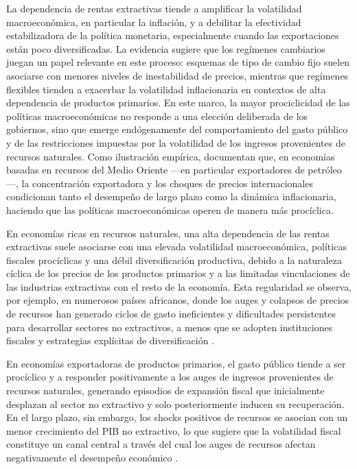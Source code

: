 \documentclass[../../TFM.tex]{subfiles}
\begin{document}
	La dependencia de rentas extractivas tiende a amplificar la volatilidad macroeconómica, en particular la inflación, y a debilitar la efectividad estabilizadora de la política monetaria, especialmente cuando las exportaciones están poco diversificadas. La evidencia sugiere que los regímenes cambiarios juegan un papel relevante en este proceso: esquemas de tipo de cambio fijo suelen asociarse con menores niveles de inestabilidad de precios, mientras que regímenes flexibles tienden a exacerbar la volatilidad inflacionaria en contextos de alta dependencia de productos primarios. En este marco, la mayor prociclicidad de las políticas macroeconómicas no responde a una elección deliberada de los gobiernos, sino que emerge endógenamente del comportamiento del gasto público y de las restricciones impuestas por la volatilidad de los ingresos provenientes de recursos naturales. Como ilustración empírica, \textcite{Kamar2017} documentan que, en economías basadas en recursos del Medio Oriente —en particular exportadores de petróleo—, la concentración exportadora y los choques de precios internacionales condicionan tanto el desempeño de largo plazo como la dinámica inflacionaria, haciendo que las políticas macroeconómicas operen de manera más procíclica.
	
	En economías ricas en recursos naturales, una alta dependencia de las rentas extractivas suele asociarse con una elevada volatilidad macroeconómica, políticas fiscales procíclicas y una débil diversificación productiva, debido a la naturaleza cíclica de los precios de los productos primarios y a las limitadas vinculaciones de las industrias extractivas con el resto de la economía. Esta regularidad se observa, por ejemplo, en numerosos países africanos, donde los auges y colapsos de precios de recursos han generado ciclos de gasto ineficientes y dificultades persistentes para desarrollar sectores no extractivos, a menos que se adopten instituciones fiscales y estrategias explícitas de diversificación \parencite{Bond2014}.
	
	En economías exportadoras de productos primarios, el gasto público tiende a ser procíclico y a responder positivamente a los auges de ingresos provenientes de recursos naturales, generando episodios de expansión fiscal que inicialmente desplazan al sector no extractivo y solo posteriormente inducen su recuperación. En el largo plazo, sin embargo, los shocks positivos de recursos se asocian con un menor crecimiento del PIB no extractivo, lo que sugiere que la volatilidad fiscal constituye un canal central a través del cual los auges de recursos afectan negativamente el desempeño económico \parencite{Arezki2012}.
	
\end{document}
